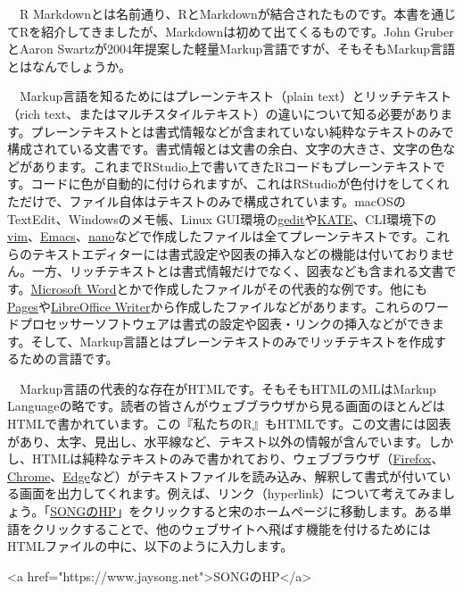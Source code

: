\documentclass[
  a4paper,
  pandoc,
  ja=standard,
  jafont=haranoaji]{bxjsbook}
\newenvironment{Shaded}{\begin{snugshade}}{\end{snugshade}}
\newcommand{\ErrorTok}[1]{\textcolor[rgb]{0.68,0.00,0.00}{#1}}
\newcommand{\KeywordTok}[1]{\textcolor[rgb]{0.00,0.48,0.65}{#1}}
\newcommand{\NormalTok}[1]{\textcolor[rgb]{0.00,0.48,0.65}{#1}}
\newcommand{\OtherTok}[1]{\textcolor[rgb]{0.00,0.48,0.65}{#1}}
\newcommand{\StringTok}[1]{\textcolor[rgb]{0.13,0.47,0.30}{#1}}
\begin{document}
　R
Markdownとは名前通り、RとMarkdownが結合されたものです。本書を通じてRを紹介してきましたが、Markdownは初めて出てくるものです。John
GruberとAaron
Swartzが2004年提案した軽量Markup言語ですが、そもそもMarkup言語とはなんでしょうか。

　Markup言語を知るためにはプレーンテキスト（plain
text）とリッチテキスト（rich
text、またはマルチスタイルテキスト）の違いについて知る必要があります。プレーンテキストとは書式情報などが含まれていない純粋なテキストのみで構成されている文書です。書式情報とは文書の余白、文字の大きさ、文字の色などがあります。これまでRStudio上で書いてきたRコードもプレーンテキストです。コードに色が自動的に付けられますが、これはRStudioが色付けをしてくれただけで、ファイル自体はテキストのみで構成されています。macOSのTextEdit、Windowsのメモ帳、Linux
GUI環境の\href{https://wiki.gnome.org/Apps/Gedit}{gedit}や\href{https://kate-editor.org}{KATE}、CLI環境下の\href{https://www.vim.org}{vim}、\href{https://www.gnu.org/software/emacs/}{Emacs}、\href{https://www.nano-editor.org}{nano}などで作成したファイルは全てプレーンテキストです。これらのテキストエディターには書式設定や図表の挿入などの機能は付いておりません。一方、リッチテキストとは書式情報だけでなく、図表なども含まれる文書です。\href{www.microsoft.com/microsoft-365/microsoft-office}{Microsoft
Word}とかで作成したファイルがその代表的な例です。他にも\href{https://www.apple.com/jp/iwork/}{Pages}や\href{https://www.libreoffice.org}{LibreOffice
Writer}から作成したファイルなどがあります。これらのワードプロセッサーソフトウェアは書式の設定や図表・リンクの挿入などができます。そして、Markup言語とはプレーンテキストのみでリッチテキストを作成するための言語です。

　Markup言語の代表的な存在がHTMLです。そもそもHTMLのMLはMarkup
Languageの略です。読者の皆さんがウェブブラウザから見る画面のほとんどはHTMLで書かれています。この『私たちのR』もHTMLです。この文書には図表があり、太字、見出し、水平線など、テキスト以外の情報が含んでいます。しかし、HTMLは純粋なテキストのみで書かれており、ウェブブラウザ（\href{https://www.mozilla.org/firefox/}{Firefox}、\href{https://www.google.com/chrome/}{Chrome}、\href{https://www.microsoft.com/edge}{Edge}など）がテキストファイルを読み込み、解釈して書式が付いている画面を出力してくれます。例えば、リンク（hyperlink）について考えてみましょう。「\href{https://www.jaysong.net}{SONGのHP}」をクリックすると宋のホームページに移動します。ある単語をクリックすることで、他のウェブサイトへ飛ばす機能を付けるためにはHTMLファイルの中に、以下のように入力します。

\begin{Shaded}
\begin{Highlighting}[]
\KeywordTok{\textless{}a} \ErrorTok{href}\OtherTok{=}\StringTok{"https://www.jaysong.net"}\KeywordTok{\textgreater{}}\NormalTok{SONGのHP}\KeywordTok{\textless{}/a\textgreater{}}
\end{Highlighting}
\end{Shaded}
\end{document}
